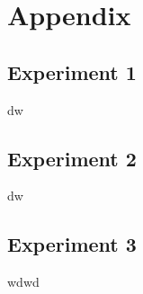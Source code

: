 \documentclass[a4paper, 12pt]{report}
\begin{document}
\cleardoublepage

\section*{Appendix}
\subsection*{Experiment 1}
dw
\subsection*{Experiment 2}
dw
\subsection*{Experiment 3}
wdwd
\end{document}
